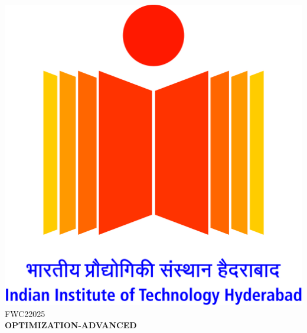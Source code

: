 \documentclass[a4,10pt]{report}
\begin{document}
\raggedright{\includegraphics[scale=0.07]{logo.jpg}}\hspace{12.425cm}\raggedleft FWC22025\vspace{2mm}\\
\centering\Large\textbf{OPTIMIZATION-ADVANCED}\vspace{5mm}\\
\end{document}
